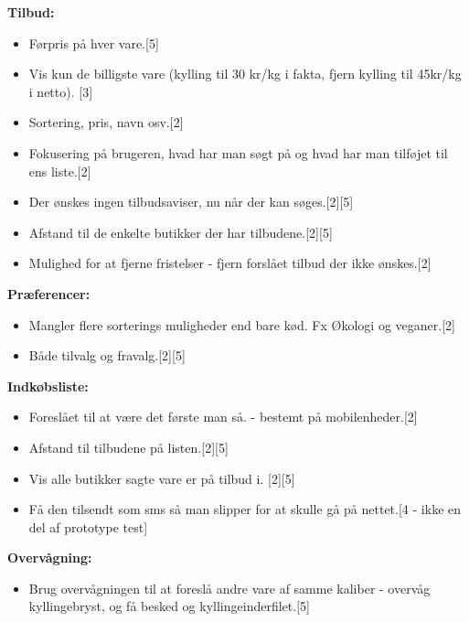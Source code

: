 		\textbf{Tilbud:}
	\begin{itemize}
		\item Førpris på hver vare.{[}5{]}
		\item Vis kun de billigste vare (kylling til 30 kr/kg i fakta, fjern kylling til 45kr/kg i netto). {[}3{]}
		\item Sortering, pris, navn osv.{[}2{]}
		\item Fokusering på brugeren, hvad har man søgt på og hvad har man tilføjet til ens liste.{[}2{]}
		\item Der ønskes ingen tilbudsaviser, nu når der kan søges.{[}2{]}{[}5{]} 
		\item Afstand til de enkelte butikker der har tilbudene.{[}2{]}{[}5{]}
		\item Mulighed for at fjerne fristelser - fjern forslået tilbud der ikke ønskes.{[}2{]}
	\end{itemize}
		\textbf{Præferencer:}
	\begin{itemize}
		\item Mangler flere sorterings muligheder end bare kød. Fx Økologi og veganer.{[}2{]}
		\item Både tilvalg og fravalg.{[}2{]}{[}5{]}
	\end{itemize}
		\textbf{Indkøbsliste:}
	\begin{itemize}
		\item Foreslået til at være det første man så. - bestemt på mobilenheder.{[}2{]}
		\item Afstand til tilbudene på listen.{[}2{]}{[}5{]}
		\item Vis alle butikker sagte vare er på tilbud i. {[}2{]}{[}5{]}
		\item Få den tilsendt som sms så man slipper for at skulle gå på nettet.{[}4 - ikke en del af prototype test{]}
	\end{itemize}
		\textbf{Overvågning:}
	\begin{itemize}
		\item Brug overvågningen til at foreslå andre vare af samme kaliber - overvåg kyllingebryst, og få besked og kyllingeinderfilet.{[}5{]}
	\end{itemize}